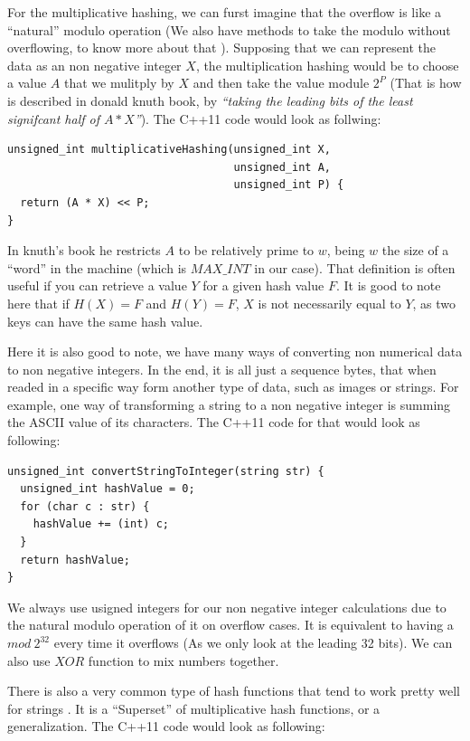 For the multiplicative hashing, we can furst imagine that the overflow is like a ``natural'' modulo operation (We also have methods to take the modulo without overflowing, to know more about that ). Supposing that we can represent the data as an non negative integer \( X \), the multiplication hashing would be to choose a value \( A \) that we mulitply by \( X \) and then take the value module \( 2^P \) (That is how is described in donald knuth book, by \textit{``taking the leading bits of the least signifcant half of \( A * X \)''}). The C++11 code would look as follwing:

\medskip

\begin{lstlisting}
unsigned_int multiplicativeHashing(unsigned_int X,
                                   unsigned_int A,
                                   unsigned_int P) {
  return (A * X) << P; 
}
\end{lstlisting}

In knuth's book he restricts \( A \) to be relatively prime to \( w \), being \( w \) the size of a ``word'' in the machine (which is \( MAX\_INT \) in our case). That definition is often useful if you can retrieve a value \( Y \) for a given hash value \( F \). It is good to note here that if \( H(X) = F \) and \( H(Y) = F \), \( X \) is not necessarily equal to \( Y \), as two keys can have the same hash value.

Here it is also good to note, we have many ways of converting non numerical data to non negative integers. In the end, it is all just a sequence bytes, that when readed in a specific way form another type of data, such as images or strings. For example, one way of transforming a string to a non negative integer is summing the ASCII value of its characters. The C++11 code for that would look as following:

\begin{lstlisting}
unsigned_int convertStringToInteger(string str) {
  unsigned_int hashValue = 0;
  for (char c : str) {
    hashValue += (int) c;
  }
  return hashValue;
}
\end{lstlisting}

We always use usigned integers for our non negative integer calculations due to the natural modulo operation of it on overflow cases. It is equivalent to having a \( mod \ 2^{32} \) every time it overflows (As we only look at the leading 32 bits). We can also use \( XOR \) function to mix numbers together. 

There is also a very common type of hash functions that tend to work pretty well for strings \cite{DragonHashFunc}. It is a ``Superset'' of multiplicative hash functions, or a generalization. The C++11 code would look as following:

